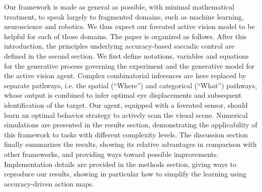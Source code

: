 Our framework is made as general as possible, with minimal mathematical treatment, to speak largely to fragmented domains, such as machine learning, neuroscience and robotics. {\color{magenta} We thus expect our foveated active vision model to be helpful for each of those domains.}
The paper is organized as follows.
After this introduction, the principles underlying accuracy-based saccadic control are defined in the second section. {\color{magenta} We first define notations, variables and equations for the generative process governing the experiment and the generative model for the active vision agent.}
Complex combinatorial inferences are here replaced by separate pathways, i.e. the spatial (``Where'') and categorical (``What'') pathways, whose output is combined to infer optimal eye displacements and subsequent identification of the target. Our agent, equipped with a foveated sensor, should learn an optimal behavior strategy to actively scan the visual scene.  Numerical simulations are presented in the results section, demonstrating the applicability of this framework to tasks with different complexity levels. %
The discussion section finally summarizes the results, showing its relative advantages in comparison with other frameworks, and providing ways toward possible improvements.
Implementation details are provided in the methods section, giving ways to reproduce our results,  showing in particular how to simplify the learning using accuracy-driven action maps.


